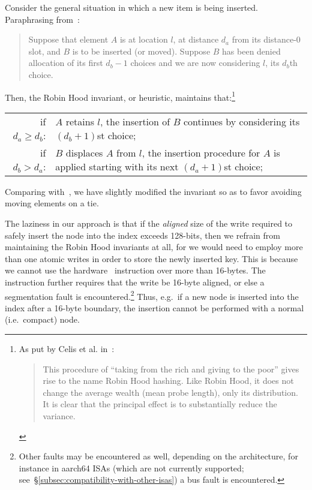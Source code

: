 Consider the general situation in which a new item is being inserted.
Paraphrasing from~\cite{robin-hood}:
\begin{quote}
	Suppose that element $A$ is at location $l$, at distance $d_a$ from its distance-0 slot, and $B$ is to be inserted (or moved).
	Suppose $B$ has been denied allocation of its first $d_b - 1$ choices and we are now considering $l$, its $d_b$th choice.
\end{quote}

Then, the Robin Hood invariant, or heuristic, maintains that:\footnote{
	As put by Celis et al. in~\cite{robin-hood}:
	\begin{quote}
		This procedure of ``taking from the rich and giving to the poor'' gives rise to the name Robin Hood hashing.
		Like Robin Hood, it does not change the average wealth (mean probe length), only its distribution.
		It is clear that the principal effect is to substantially reduce the variance.
	\end{quote}
}

\begin{tabular}{rp{8cm}}
	if $d_a \geq d_b$: & $A$ retains $l$, the insertion of $B$ continues by considering its $(d_b + 1)$st choice; \\
	if $d_b > d_a$: & $B$ displaces $A$ from $l$, the insertion procedure for $A$ is applied starting with its next $(d_a + 1)$st choice; \\
\end{tabular}

Comparing with~\cite{robin-hood}, we have slightly modified the invariant so as to favor avoiding moving elements on a tie.

The laziness in our approach is that if the \emph{aligned} size of the write required to safely insert the node into the index exceeds 128-bits, then we refrain from maintaining the Robin Hood invariants at all, for we would need to employ more than one atomic writes in order to store the newly inserted key.
This is because we cannot use the hardware~\cite[CMPXCHG--Compare and Exchange]{x86-64} instruction over more than 16-bytes.
The instruction further requires that the write be 16-byte aligned, or else a segmentation fault is encountered.\footnote{%
	Other faults may be encountered as well, depending on the architecture, for instance in aarch64 ISAs (which are not currently supported; see~\S\ref{subsec:compatibility-with-other-isas}) a bus fault is encountered.
}
Thus, e.g.\ if a new node is inserted into the index after a 16-byte boundary, the insertion cannot be performed with a normal (i.e.\ compact) node.

